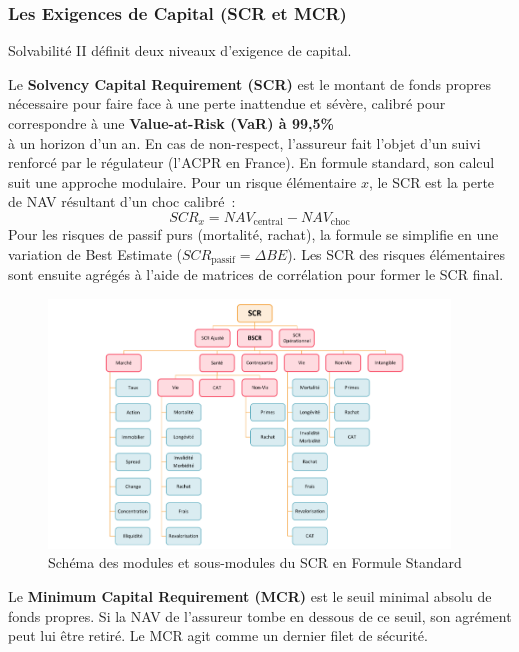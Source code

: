 \subsubsection{Les Exigences de Capital (SCR et MCR)}

Solvabilité II définit deux niveaux d'exigence de capital.


Le \textbf{Solvency Capital Requirement (SCR)} est le montant de fonds propres nécessaire pour faire face à une perte inattendue et sévère, calibré pour correspondre à une \textbf{Value-at-Risk (VaR) à 99,5\%}\\ à un horizon d'un an. En cas de non-respect, l'assureur fait l'objet d'un suivi renforcé par le régulateur (l'ACPR en France). En formule standard, son calcul suit une approche modulaire. Pour un risque élémentaire $x$, le SCR est la perte de NAV résultant d'un choc calibré~:
\begin{equation}
    SCR_{x} = NAV_{\text{central}} - NAV_{\text{choc}}
\end{equation}
Pour les risques de passif purs (mortalité, rachat), la formule se simplifie en une variation de Best Estimate ($SCR_{\text{passif}} = \Delta BE$). Les SCR des risques élémentaires sont ensuite agrégés à l'aide de matrices de corrélation pour former le SCR final.



\begin{figure}[H]
    \centering
    \includegraphics[width=0.95\textwidth]{images/2_chapitres/chapitre1/pieuvre_scr.png}
    \caption{Schéma des modules et sous-modules du SCR en Formule Standard}
    \label{fig:pieuvre_scr}
\end{figure}

Le \textbf{Minimum Capital Requirement (MCR)} est le seuil minimal absolu de fonds propres. Si la NAV de l'assureur tombe en dessous de ce seuil, son agrément peut lui être retiré. Le MCR agit comme un dernier filet de sécurité.




